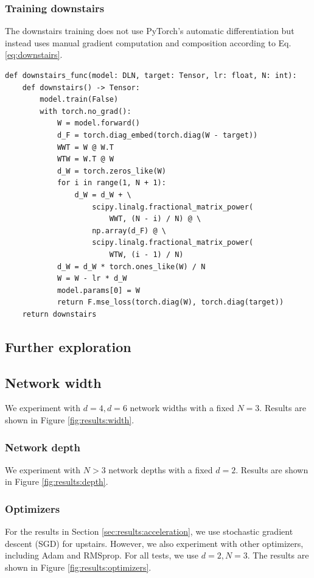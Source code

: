 \documentclass[11pt]{article}
\begin{document}
\subsubsection{Training downstairs}
The downstairs training does not use PyTorch's automatic differentiation but instead uses manual gradient computation and composition according to Eq. \ref {eq:downstairs}.
\begin{verbatim}
def downstairs_func(model: DLN, target: Tensor, lr: float, N: int):
    def downstairs() -> Tensor:
        model.train(False)
        with torch.no_grad():
            W = model.forward()
            d_F = torch.diag_embed(torch.diag(W - target))
            WWT = W @ W.T
            WTW = W.T @ W
            d_W = torch.zeros_like(W)
            for i in range(1, N + 1):
                d_W = d_W + \
                    scipy.linalg.fractional_matrix_power(
                        WWT, (N - i) / N) @ \
                    np.array(d_F) @ \
                    scipy.linalg.fractional_matrix_power(
                        WTW, (i - 1) / N)
            d_W = d_W * torch.ones_like(W) / N
            W = W - lr * d_W
            model.params[0] = W
            return F.mse_loss(torch.diag(W), torch.diag(target))
    return downstairs
\end{verbatim}

\subsection{Further exploration}

\subsection{Network width}
We experiment with $d=4, d=6$ network widths with a fixed $N = 3$. Results are shown in Figure \ref{fig:results:width}.

\subsubsection{Network depth}
We experiment with $N > 3$ network depths with a fixed $d = 2$. Results are shown in Figure \ref{fig:results:depth}.

\subsubsection{Optimizers}
For the results in Section \ref{sec:results:acceleration}, we use stochastic gradient descent (SGD) for upstairs. However, we also experiment with other optimizers, including Adam and RMSprop. For all tests, we use $d = 2, N = 3$. The results are shown in Figure \ref{fig:results:optimizers}.
\end{document}
